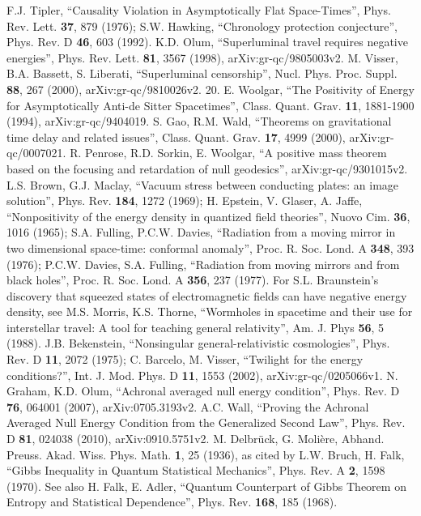 \documentclass[12pt]{article}
\begin{document}
\begin{thebibliography}{99}
F.J. Tipler, ``Causality Violation in Asymptotically Flat Space-Times'', Phys. Rev. Lett. \textbf{37}, 879 (1976); 
S.W. Hawking, ``Chronology protection conjecture'', Phys. Rev. D \textbf{46}, 603 (1992).
K.D. Olum, ``Superluminal travel requires negative energies'', Phys. Rev. Lett. \textbf{81}, 3567 (1998), arXiv:gr-qc/9805003v2.
M. Visser, B.A. Bassett, S. Liberati, ``Superluminal censorship'', Nucl. Phys. Proc. Suppl. \textbf{88}, 267 (2000), arXiv:gr-qc/9810026v2.
20.
E. Woolgar, ``The Positivity of Energy for Asymptotically Anti-de Sitter Spacetimes'', Class. Quant. Grav. \textbf{11}, 1881-1900 (1994), arXiv:gr-qc/9404019.
S. Gao, R.M. Wald, ``Theorems on gravitational time delay and related issues'', Class. Quant. Grav. \textbf{17}, 4999 (2000), 	arXiv:gr-qc/0007021.
R. Penrose, R.D. Sorkin, E. Woolgar, ``A positive mass theorem based on the focusing and retardation of null geodesics'', arXiv:gr-qc/9301015v2.
L.S. Brown, G.J. Maclay, ``Vacuum stress between conducting plates: an image solution'', Phys. Rev. \textbf{184}, 1272 (1969); 
H. Epstein, V. Glaser, A. Jaffe, ``Nonpositivity of the energy density in quantized field theories'', Nuovo Cim. \textbf{36}, 1016 (1965);
S.A. Fulling, P.C.W. Davies, ``Radiation from a moving mirror in two dimensional space-time: conformal anomaly'', 
Proc. R. Soc. Lond. A \textbf{348}, 393 (1976); 
P.C.W. Davies, S.A. Fulling, ``Radiation from moving mirrors and from black holes'', Proc. R. Soc. Lond. A \textbf{356}, 237 (1977). 
For S.L. Braunstein's discovery that squeezed states of electromagnetic fields can have negative energy density, see M.S. Morris, 
K.S. Thorne, ``Wormholes in spacetime and their use for interstellar travel: A tool for teaching general relativity'', Am. J. Phys \textbf{56}, 5 (1988).
J.B. Bekenstein, ``Nonsingular general-relativistic cosmologies'', Phys. Rev. D \textbf{11}, 2072 (1975);
C. Barcelo, M. Visser, ``Twilight for the energy conditions?'', Int. J. Mod. Phys. D \textbf{11}, 1553 (2002), arXiv:gr-qc/0205066v1.
N. Graham, K.D. Olum, ``Achronal averaged null energy condition'', Phys. Rev. D \textbf{76}, 064001 (2007), arXiv:0705.3193v2.
A.C. Wall, ``Proving the Achronal Averaged Null Energy Condition from the Generalized Second Law'', Phys. Rev. D \textbf{81}, 024038 (2010), arXiv:0910.5751v2.
M. Delbr\"uck, G. Moli\`ere, Abhand. Preuss. Akad. Wiss. Phys. Math. \textbf{1}, 25 (1936), as cited by L.W. Bruch, H. Falk, ``Gibbs Inequality in Quantum Statistical Mechanics'', Phys. Rev. A \textbf{2}, 1598 (1970).  See also H. Falk, E. Adler, ``Quantum Counterpart of Gibbs Theorem on Entropy and Statistical Dependence'', Phys. Rev. \textbf{168}, 185 (1968).

\end{thebibliography}
\end{document}
